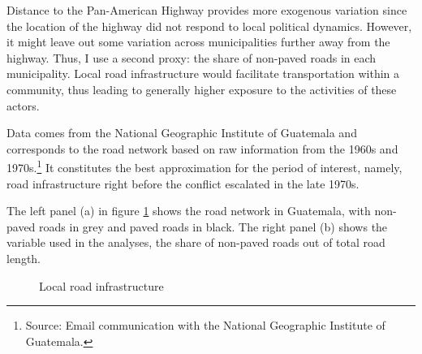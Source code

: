 \documentclass[12pt, notitlepage]{article}
\begin{document}
Distance to the Pan-American Highway provides more exogenous variation since the location of the highway did not respond to local political dynamics.
However, it might leave out some variation across municipalities further away from the highway.
Thus, I use a second proxy: the share of non-paved roads in each municipality.
Local road infrastructure would facilitate transportation within a community, thus leading to generally higher exposure to the activities of these actors.

Data comes from the National Geographic Institute of Guatemala \citep{Segeplan:2019aa} and corresponds to the road network based on raw information from the 1960s and 1970s.\footnote{Source: Email communication with the National Geographic Institute of Guatemala.}
It constitutes the best approximation for the period of interest, namely, road infrastructure right before the conflict escalated in the late 1970s.

The left panel (a) in figure \ref{fig:map_roads} shows the road network in Guatemala, with non-paved roads in grey and paved roads in black.
The right panel (b) shows the variable used in the analyses, the share of non-paved roads out of total road length.

\begin{figure}[!ht]
    \centering

    \begin{minipage}{1\textwidth}
      \centering
      \hspace{25pt}
    \end{minipage}

    \caption{Local road infrastructure} \label{fig:map_roads}

\end{figure}
\end{document}
